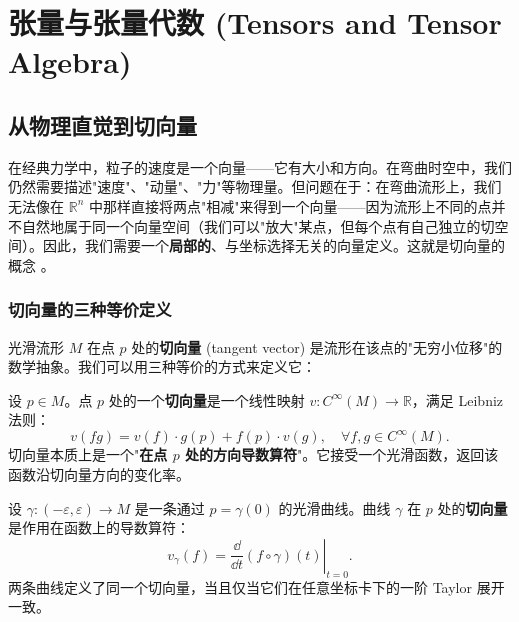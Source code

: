 \chapter{张量与张量代数 (Tensors and Tensor Algebra)}
\label{chap:tensor}

\section{从物理直觉到切向量}

\begin{note}[物理动机]
在经典力学中，粒子的速度是一个向量——它有大小和方向。在弯曲时空中，我们仍然需要描述"速度"、"动量"、"力"等物理量。但问题在于：在弯曲流形上，我们无法像在 $\mathbb{R}^n$ 中那样直接将两点"相减"来得到一个向量——因为流形上不同的点并不自然地属于同一个向量空间（我们可以"放大"某点，但每个点有自己独立的切空间）。因此，我们需要一个\textbf{局部的}、与坐标选择无关的向量定义。这就是切向量的概念 \cite{Carroll1997,Reall_Part3_GR}。
\end{note}

\subsection{切向量的三种等价定义}

光滑流形 $M$ 在点 $p$ 处的\textbf{切向量} (tangent vector) 是流形在该点的"无穷小位移"的数学抽象。我们可以用三种等价的方式来定义它：

\begin{definition}
设 $p \in M$。点 $p$ 处的一个\textbf{切向量}是一个线性映射 $v: C^\infty(M) \to \mathbb{R}$，满足 Leibniz 法则：
\begin{equation}
    v(fg) = v(f) \cdot g(p) + f(p) \cdot v(g), \quad \forall f,g \in C^\infty(M).
\end{equation}
切向量本质上是一个"\textbf{在点 $p$ 处的方向导数算符}"。它接受一个光滑函数，返回该函数沿切向量方向的变化率。
\end{definition}

\begin{definition}
设 $\gamma: (-\varepsilon, \varepsilon) \to M$ 是一条通过 $p = \gamma(0)$ 的光滑曲线。曲线 $\gamma$ 在 $p$ 处的\textbf{切向量}是作用在函数上的导数算符：
\begin{equation}
    v_\gamma(f) = \left.\frac{\dd}{\dd t} (f \circ \gamma)(t)\right|_{t=0}.
\end{equation}
两条曲线定义了同一个切向量，当且仅当它们在任意坐标卡下的一阶 Taylor 展开一致。
\end{definition}

